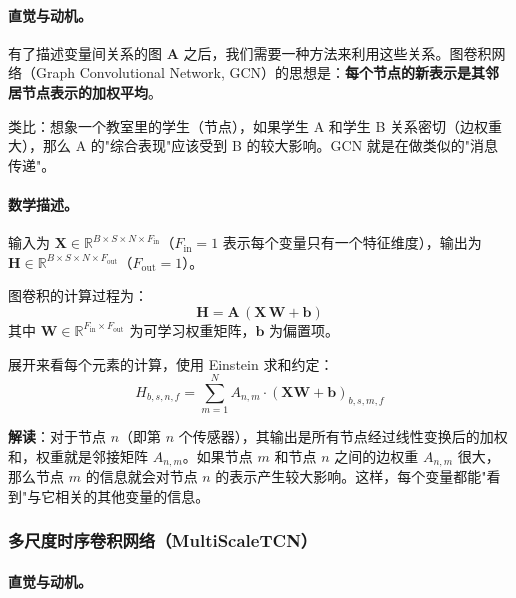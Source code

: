 \documentclass[UTF8]{ctexart}
\begin{document}
\paragraph{直觉与动机。}

有了描述变量间关系的图 $\mathbf{A}$ 之后，我们需要一种方法来利用这些关系。图卷积网络（Graph Convolutional Network, GCN）的思想是：\textbf{每个节点的新表示是其邻居节点表示的加权平均}。

类比：想象一个教室里的学生（节点），如果学生 A 和学生 B 关系密切（边权重大），那么 A 的"综合表现"应该受到 B 的较大影响。GCN 就是在做类似的"消息传递"。

\paragraph{数学描述。}

输入为 $\mathbf{X} \in \mathbb{R}^{B \times S \times N \times F_{\text{in}}}$（$F_{\text{in}}=1$ 表示每个变量只有一个特征维度），输出为 $\mathbf{H} \in \mathbb{R}^{B \times S \times N \times F_{\text{out}}}$（$F_{\text{out}}=1$）。

图卷积的计算过程为：
\begin{equation}
    \mathbf{H} = \mathbf{A} \, (\mathbf{X} \, \mathbf{W} + \mathbf{b})
\end{equation}
其中 $\mathbf{W} \in \mathbb{R}^{F_{\text{in}} \times F_{\text{out}}}$ 为可学习权重矩阵，$\mathbf{b}$ 为偏置项。

展开来看每个元素的计算，使用 Einstein 求和约定：
\begin{equation}
    H_{b,s,n,f} = \sum_{m=1}^{N} A_{n,m} \cdot (\mathbf{X} \mathbf{W} + \mathbf{b})_{b,s,m,f}
\end{equation}

\textbf{解读}：对于节点 $n$（即第 $n$ 个传感器），其输出是所有节点经过线性变换后的加权和，权重就是邻接矩阵 $A_{n,m}$。如果节点 $m$ 和节点 $n$ 之间的边权重 $A_{n,m}$ 很大，那么节点 $m$ 的信息就会对节点 $n$ 的表示产生较大影响。这样，每个变量都能"看到"与它相关的其他变量的信息。

\subsubsection{多尺度时序卷积网络（MultiScaleTCN）}

\paragraph{直觉与动机。}
\end{document}
